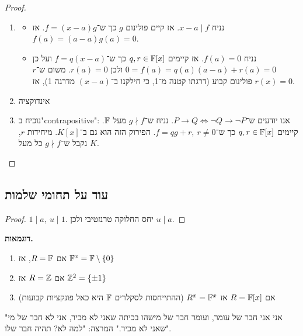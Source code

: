 \documentclass[]{../../../../tex/classes/styledArticle}
\begin{document}
	\begin{proof}
		\begin{enumerate}\,
			\item \begin{itemize}
				\item[$\implies$] נניח $x - a \mid f$. אז קיים פולינום $g$ כך ש־$f = (x - a)g$. אז $f(a) = (a - a)g(a) = 0$. 
				\item[$\impliedby$] נניח $f(a) = 0$. אז קיימים $q, r \in \mathbb{F}[x]$ כך ש־$f = q(x - a)$ ועל כן $0 = f(a) = q(a)(a - a) + r(a) = 0$ ולכן $r(a) = 0$. משום ש־$r$ פולינום קבוע (דרגתו קטנה מ־1, כי חילקנו ב־$(x - a)$ מדרגה 1), אז $r(x) = 0$. 
			\end{itemize}
			\item אינדוקציה
			\item נוכיח ב"contrapositive": אנו יודעים ש־$P \to Q \iff \lnot Q \to \lnot P$. נניח ש־$g \nmid f$ מעל $\mathbb{F}$. קיימים $q, r \in \mathbb{F}[x]$ כך ש־$f =qg + r, \ r \neq 0$. הפירוק הזה הוא גם ב־$K[x]$. מיחידות $r$, נקבל ש־$g \nmid f$ כל מעל $K$. 
		\end{enumerate}
	\end{proof}
	
	\subsection{עוד על תחומי שלמות}
	\begin{proof}
		$1 \mid a, \ u \mid 1$. יחס החלוקה טרנזטיבי ולכן $u \mid a$. 
	\end{proof}
	\textbf{דוגמאות. }
	\begin{enumerate}
		\item אם $R = \mathbb{F}$, אז $\mathbb{F}^x = \mathbb{F} \setminus \{0\}$
		\item אם $R = \mathbb{Z}$ אז $\mathbb{Z}^2 = \{\pm 1\}$
		\item אם $R = \mathbb{F}[x]$ אז $R^x = \mathbb{F}^x$ (ההתייחסות לסקלרים $\mathbb{F}$ היא כאל פונקציות קבועות)
	\end{enumerate}
	"אני אני חבר של עומר, ועומר חבר של מישהו בכיתה שאני לא מכיר, אני לא חבר של מי שאני לא מכיר." המרצה: "למה לא? תהיה חבר שלו". 
	
\end{document}
